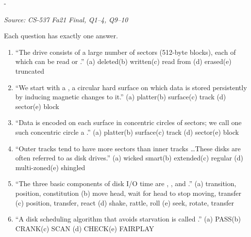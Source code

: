 \documentclass[11pt,a4paper]{article}
\makeatletter
\newcommand{\keepspace}[1]{\par\penalty-100\begingroup
  \setlength{\dimen@}{#1}\dimen@ii\pagegoal\advance\dimen@ii-\pagetotal
  \ifdim\dimen@>\dimen@ii\ifdim\dimen@ii>\z@\vfil\fi\break\fi\endgroup}
\newcounter{qn}[section]
\newenvironment{Qn}[4]{%
  \refstepcounter{qn}\keepspace{7\baselineskip}%
  \begin{tcolorbox}[qboxstyle, title={Q\thesection.\theqn\ \ [#1 \textbar\ #2]\ \ #4}]%
  {\footnotesize\color{g3}\textit{Source: #3}}\par\smallskip%
}{%
  \end{tcolorbox}%
}
\makeatother
\begin{document}
\begin{Qn}{Easy-Medium}{Lect 22}{CS-537 Fa21 Final, Q1--4, Q9--10}{Hard-drive vocabulary (Word Thief fill-in)}
Each question has exactly one answer.
\begin{enumerate}
\item[1.] ``The drive consists of a large number of sectors (512-byte
      blocks), each of which can be read or \underline{\hspace{1.2cm}}.''
      (a) deleted\quad (b) written\quad (c) read from\quad
      (d) erased\quad (e) truncated
\item[2.] ``We start with a \underline{\hspace{1.2cm}}, a circular hard
      surface on which data is stored persistently by inducing magnetic
      changes to it.''
      (a) platter\quad (b) surface\quad (c) track\quad
      (d) sector\quad (e) block
\item[3.] ``Data is encoded on each surface in concentric circles of
      sectors; we call one such concentric circle a
      \underline{\hspace{1.2cm}}.''
      (a) platter\quad (b) surface\quad (c) track\quad
      (d) sector\quad (e) block
\item[4.] ``Outer tracks tend to have more sectors than inner tracks
      \ldots These disks are often referred to as
      \underline{\hspace{1.2cm}} disk drives.''
      (a) wicked smart\quad (b) extended\quad (c) regular\quad
      (d) multi-zoned\quad (e) shingled
\item[9.] ``The three basic components of disk I/O time are
      \underline{\hspace{1.2cm}}, \underline{\hspace{1.2cm}}, and
      \underline{\hspace{1.2cm}}.''
      (a) transition, position, constitution\quad
      (b) move head, wait for head to stop moving, transfer\quad
      (c) position, transfer, react\quad
      (d) shake, rattle, roll\quad
      (e) seek, rotate, transfer
\item[10.] ``A disk scheduling algorithm that avoids starvation is
      called \underline{\hspace{1.2cm}}.''
      (a) PASS\quad (b) CRANK\quad (c) SCAN\quad
      (d) CHECK\quad (e) FAIRPLAY
\end{enumerate}
\end{Qn}
\end{document}
